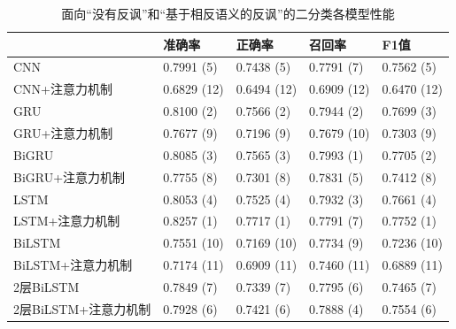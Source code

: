\begin{table}[htb]
  \centering
  \begin{minipage}[t]{\linewidth}
  \caption{面向“没有反讽”和“基于相反语义的反讽”的二分类各模型性能}
  \label{tab:exp_irony_det_Bb01_result}
    \begin{tabularx}{\linewidth}{X|llll}
    \toprule[1.5pt]
    & 准确率 & 正确率 & 召回率 & F1值 \\
    \hline
    CNN & 0.7991 (5) & 0.7438 (5) & 0.7791 (7) & 0.7562 (5) \\ %
    CNN+注意力机制 & 0.6829 (12) & 0.6494 (12) & 0.6909 (12) & 0.6470 (12) \\ %
    \hline
    GRU & 0.8100 (2) & 0.7566 (2) & 0.7944 (2) & 0.7699 (3) \\ %
    GRU+注意力机制 & 0.7677 (9) & 0.7196 (9) & 0.7679 (10) & 0.7303 (9) \\ %
    \hline
    BiGRU & 0.8085 (3) & 0.7565 (3) & 0.7993 (1) & 0.7705 (2) \\ %
    BiGRU+注意力机制 & 0.7755 (8) & 0.7301 (8) & 0.7831 (5) & 0.7412 (8) \\ %
    \hline
    LSTM & 0.8053 (4) & 0.7525 (4) & 0.7932 (3) & 0.7661 (4) \\ %
    LSTM+注意力机制 & 0.8257 (1) & 0.7717 (1) & 0.7791 (7) & 0.7752 (1) \\ %
    \hline
    BiLSTM & 0.7551 (10) & 0.7169 (10) & 0.7734 (9) & 0.7236 (10) \\ %
    BiLSTM+注意力机制 & 0.7174 (11) & 0.6909 (11) & 0.7460 (11) & 0.6889 (11) \\ %
    \hline
    2层BiLSTM & 0.7849 (7) & 0.7339 (7) & 0.7795 (6) & 0.7465 (7) \\ %
    2层BiLSTM+注意力机制 & 0.7928 (6) & 0.7421 (6) & 0.7888 (4) & 0.7554 (6) \\ %
    \bottomrule[1.5pt]
    \end{tabularx}
  \end{minipage}
\end{table}

